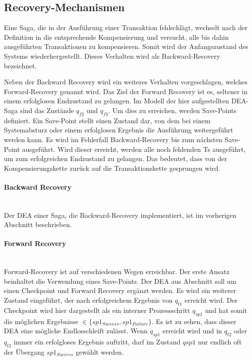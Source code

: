 \subsection{Recovery-Mechanismen} %
Eine Saga, die in der Ausführung einer Transaktion fehlschlägt, wechselt nach der Definition in die entsprechende Kompensierung und versucht, alle bis dahin ausgeführten Transaktionen zu kompensieren. Somit wird der Anfangszustand des Systems wiederhergestellt. Dieses Verhalten wird als Backward-Recovery bezeichnet. 

Neben der Backward Recovery wird ein weiteres Verhalten vorgeschlagen, welches Forward-Recovery genannt wird. Das Ziel der Forward Recovery ist es, seltener in einem erfolglosen Endzustand zu gelangen. Im Modell der hier aufgestellten DEA-Saga sind das Zustände $q_{f2}$ und $q_{f3}$. Um dies zu erreichen, werden Save-Points definiert. Ein Save-Point stellt einen Zustand dar, von dem bei einem Systemabsturz oder einem erfolglosen Ergebnis die Ausführung weitergeführt werden kann. Es wird im Fehlerfall Backward-Recovery bis zum nächsten Save-Point ausgeführt. Wird dieser erreicht, werden alle noch fehlenden Ts ausgeführt, um zum erfolgreichen Endzustand zu gelangen. Das bedeutet, dass von der Kompensierungskette zurück auf die Transaktionskette gesprungen wird.


\paragraph*{Backward Recovery}\mbox{}\\
Der DEA einer Saga, die Backward-Recovery implementiert, ist im vorherigen Abschnitt beschrieben.

\paragraph*{Forward Recovery} \mbox{}\\
Forward-Recovery ist auf verschiedenen Wegen erreichbar. Der erste Ansatz beinhaltet die Verwendung eines Save-Points. Der DEA aus Abschnitt soll um einen Checkpoint und Forward Recovery ergänzt werden. Es wird ein weiterer Zustand eingeführt, der nach erfolgreichem Ergebnis von $q_{t1}$ erreicht wird. Der Checkpoint wird hier dargestellt als ein interner Prozessschritt $q_{sp1}$ und hat somit die möglichen Ergebnisse $\in \{sp1_{Success}, sp1_{Failure}\}$. Es ist zu sehen, dass dieser DEA eine mögliche Endlosschleift zulässt. Wenn $q_{sp1}$ erreicht wird und in $q_{t2}$ oder $q_{t3}$ immer ein erfolgloses Ergebnis auftritt, darf im Zustand $qsp1$ nur endlich oft der Übergang $sp1_{Success}$ gewählt werden. 

